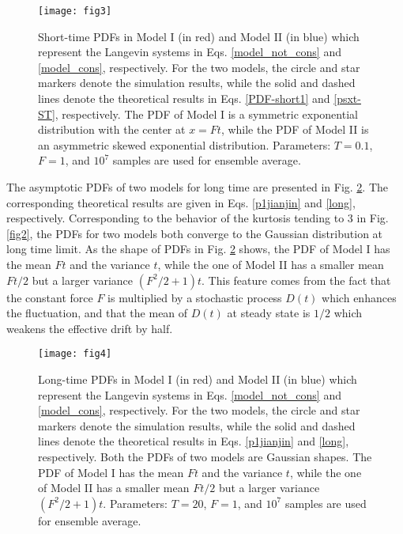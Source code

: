 \documentclass[aps,pre,twocolumn,groupedaddress,longbibliography]{revtex4-2}
\begin{document}
\begin{figure}
  \centering
  \texttt{[image: fig3]}\\
  \caption{Short-time PDFs in Model I (in red) and Model II (in blue) which represent the Langevin systems in Eqs. \eqref{model_not_cons} and \eqref{model_cons}, respectively. For the two models, the circle and star markers denote the simulation results, while the solid and dashed lines denote the theoretical results in Eqs. \eqref{PDF-short1} and \eqref{psxt-ST}, respectively. The PDF of Model I is a symmetric exponential distribution with the center at $x=Ft$, while the PDF of Model II is an asymmetric skewed exponential distribution.
Parameters: $T=0.1$, $F=1$, and $10^7$ samples are used for ensemble average.}\label{fig3}
\end{figure}


The asymptotic PDFs of two models for long time are presented in Fig. \ref{fig4}. The corresponding theoretical results are given in Eqs. \eqref{p1jianjin} and \eqref{long}, respectively. Corresponding to the behavior of the kurtosis tending to $3$ in Fig. \ref{fig2}, the PDFs for two models both converge to the Gaussian distribution at long time limit. As the shape of PDFs in Fig. \ref{fig4} shows, the PDF of Model I has the mean $Ft$ and the variance $t$, while the one of Model II has a smaller mean $Ft/2$ but a larger variance $(F^2/2+1)t$. This feature comes from the fact that the constant force $F$ is multiplied by a stochastic process $D(t)$ which enhances the fluctuation, and that the mean of $D(t)$ at steady state is $1/2$ which weakens the effective drift by half.


\begin{figure}
  \centering
  \texttt{[image: fig4]}\\
  \caption{Long-time PDFs in Model I (in red) and Model II (in blue) which represent the Langevin systems in Eqs. \eqref{model_not_cons} and \eqref{model_cons}, respectively. For the two models, the circle and star markers denote the simulation results, while the solid and dashed lines denote the theoretical results in Eqs. \eqref{p1jianjin} and \eqref{long}, respectively. Both the PDFs of two models are Gaussian shapes. The PDF of Model I has the mean $Ft$ and the variance $t$, while the one of Model II has a smaller mean $Ft/2$ but a larger variance $(F^2/2+1)t$.
Parameters: $T=20$, $F=1$, and $10^7$ samples are used for ensemble average.}\label{fig4}
\end{figure}
\end{document}
